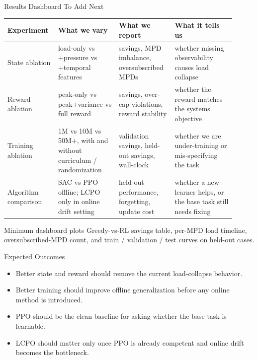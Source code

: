 \documentclass[10pt,aspectratio=169]{beamer}
\begin{document}
\begin{frame}{Results Dashboard To Add Next}
  \scriptsize
  \begin{tabular}{p{0.18\linewidth}p{0.25\linewidth}p{0.23\linewidth}p{0.25\linewidth}}
    \toprule
    \textbf{Experiment} & \textbf{What we vary} & \textbf{What we report} & \textbf{What it tells us} \\
    \midrule
    State ablation &
    load-only vs +pressure vs +temporal features &
    savings, MPD imbalance, oversubscribed MPDs &
    whether missing observability causes load collapse \\
    Reward ablation &
    peak-only vs peak+variance vs full reward &
    savings, over-cap violations, reward stability &
    whether the reward matches the systems objective \\
    Training ablation &
    1M vs 10M vs 50M+, with and without curriculum / randomization &
    validation savings, held-out savings, wall-clock &
    whether we are under-training or mis-specifying the task \\
    Algorithm comparison &
    SAC vs PPO offline; LCPO only in online drift setting &
    held-out performance, forgetting, update cost &
    whether a new learner helps, or the base task still needs fixing \\
    \bottomrule
  \end{tabular}

  \vspace{0.35em}
  \begin{block}{Minimum dashboard plots}
    \scriptsize
    Greedy-vs-RL savings table, per-MPD load timeline, oversubscribed-MPD count, and train / validation / test curves on held-out cases.
  \end{block}
\end{frame}

\begin{frame}{Expected Outcomes}
  \begin{itemize}
    \item Better state and reward should remove the current load-collapse behavior.
    \item Better training should improve offline generalization before any online method is introduced.
    \item PPO should be the clean baseline for asking whether the base task is learnable.
    \item LCPO should matter only once PPO is already competent and online drift becomes the bottleneck.
  \end{itemize}
\end{frame}
\end{document}
